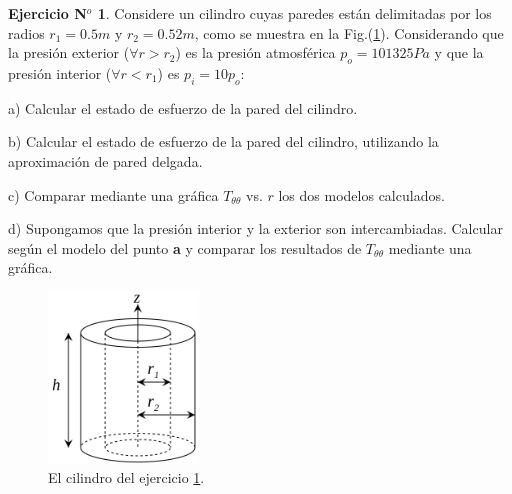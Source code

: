 \documentclass[12pt,a4paper]{article}
\theoremstyle{definition}
\newtheorem{theorem}{Ejercicio N$^o$}
\begin{document}
\bigskip


\begin{theorem} \label{esiete}
Considere un cilindro cuyas paredes están delimitadas por los radios $r_1 = 0.5 m$ y $r_2 = 0.52 m$, como se muestra en la Fig.(\ref{ej7}). Considerando que la presión exterior ($\forall r > r_2$) es la presión atmosférica $p_o = 101325 Pa$ y que la presión interior ($\forall r < r_1$) es $p_i = 10 p_o$:

\noindent a) Calcular el estado de esfuerzo de la pared del cilindro.

\noindent b) Calcular el estado de esfuerzo de la pared del cilindro, utilizando la aproximación de pared delgada.

\noindent c) Comparar mediante una gráfica $T_{\theta \theta}$ vs. $r$ los dos modelos calculados.

\noindent d) Supongamos que la presión interior y la exterior son intercambiadas. Calcular según el modelo del punto \textbf{a} y comparar los resultados de $T_{\theta \theta}$ mediante una gráfica. 

\end{theorem}

\begin{figure}[htb!] 
\begin{center}
\includegraphics[width=40mm]{cilindro.jpg}
\caption{El cilindro del ejercicio \ref{esiete}.} 
\label{ej7}
\end{center}
\end{figure}
\end{document}
